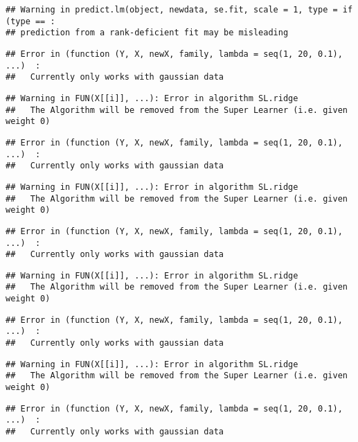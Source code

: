 \documentclass[
]{article}
\begin{document}
\begin{verbatim}
## Warning in predict.lm(object, newdata, se.fit, scale = 1, type = if (type == :
## prediction from a rank-deficient fit may be misleading
\end{verbatim}

\begin{verbatim}
## Error in (function (Y, X, newX, family, lambda = seq(1, 20, 0.1), ...)  : 
##   Currently only works with gaussian data
\end{verbatim}

\begin{verbatim}
## Warning in FUN(X[[i]], ...): Error in algorithm SL.ridge 
##   The Algorithm will be removed from the Super Learner (i.e. given weight 0)
\end{verbatim}

\begin{verbatim}
## Error in (function (Y, X, newX, family, lambda = seq(1, 20, 0.1), ...)  : 
##   Currently only works with gaussian data
\end{verbatim}

\begin{verbatim}
## Warning in FUN(X[[i]], ...): Error in algorithm SL.ridge 
##   The Algorithm will be removed from the Super Learner (i.e. given weight 0)
\end{verbatim}

\begin{verbatim}
## Error in (function (Y, X, newX, family, lambda = seq(1, 20, 0.1), ...)  : 
##   Currently only works with gaussian data
\end{verbatim}

\begin{verbatim}
## Warning in FUN(X[[i]], ...): Error in algorithm SL.ridge 
##   The Algorithm will be removed from the Super Learner (i.e. given weight 0)
\end{verbatim}

\begin{verbatim}
## Error in (function (Y, X, newX, family, lambda = seq(1, 20, 0.1), ...)  : 
##   Currently only works with gaussian data
\end{verbatim}

\begin{verbatim}
## Warning in FUN(X[[i]], ...): Error in algorithm SL.ridge 
##   The Algorithm will be removed from the Super Learner (i.e. given weight 0)
\end{verbatim}

\begin{verbatim}
## Error in (function (Y, X, newX, family, lambda = seq(1, 20, 0.1), ...)  : 
##   Currently only works with gaussian data
\end{verbatim}
\end{document}
